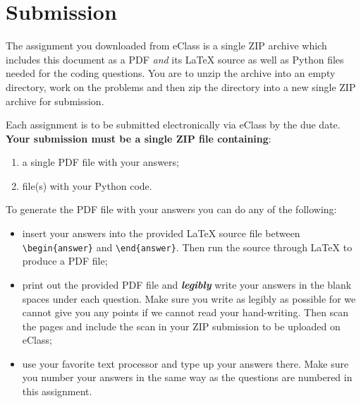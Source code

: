 \documentclass{article}
\begin{document}
\section*{Submission}
The assignment you downloaded from eClass is a single ZIP archive which includes this document as a PDF {\em and} its \LaTeX{} source as well as Python files needed for the coding questions.
%
You are to unzip the archive into an empty directory, work on the problems and then zip the directory into a new single ZIP archive for submission.

\medskip

Each assignment is to be submitted electronically via eClass by the due date.
\textbf{Your submission must be a single ZIP file containing}: 
\begin{enumerate}
    \item a single PDF file with your answers;
    \item file(s) with your Python code.
\end{enumerate}

To generate the PDF file with your answers you can do any of the following:

\begin{itemize}
    \item
    insert your answers into the provided \LaTeX{} source file between \verb|\begin{answer}| and \verb|\end{answer}|. Then run the source through \LaTeX{} to produce a PDF file;

    \item print out the provided PDF file and {\bf\it legibly} write your answers in the blank spaces under each question. Make sure you write as legibly as possible for we cannot give you any points if we cannot read your hand-writing. Then scan the pages and include the scan in your ZIP submission to be uploaded on eClass;

    \item use your favorite text processor and type up your answers there. Make sure you number your answers in the same way as the questions are numbered in this assignment.
\end{itemize}
%
%
\end{document}
